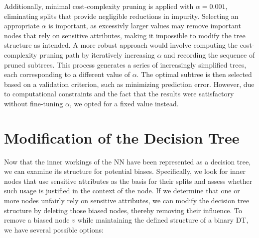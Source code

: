 Additionally, minimal cost-complexity pruning is applied with $\alpha=0.001$,
eliminating splits that provide negligible reductions in impurity.
Selecting an appropriate $\alpha$ is important, as excessivly larger values may remove important nodes that rely on sensitive attributes, making it impossible to modify the tree structure as intended.
A more robust approach would involve computing the cost-complexity pruning path by iteratively increasing $\alpha$ and recording the sequence of pruned subtrees.
This process generates a series of increasingly simplified trees, each corresponding to a different value of $\alpha$.
The optimal subtree is then selected based on a validation criterion, such as minimizing prediction error.
However, due to computational constraints and the fact that the results were satisfactory without fine-tuning $\alpha$, we opted for a fixed value instead.


\section{Modification of the Decision Tree}
\label{sec:modification}
Now that the inner workings of the NN have been represented as a decision tree,
we can examine its structure for potential biases.
Specifically, we look for inner nodes that use sensitive attributes as the basis for their splits
and assess whether such usage is justified in the context of the node.
If we determine that one or more nodes unfairly rely on sensitive attributes,
we can modify the decision tree structure by deleting those biased nodes,
thereby removing their influence.
To remove a biased node $v$ while maintaining the defined structure of a binary DT,
we have several possible options:

